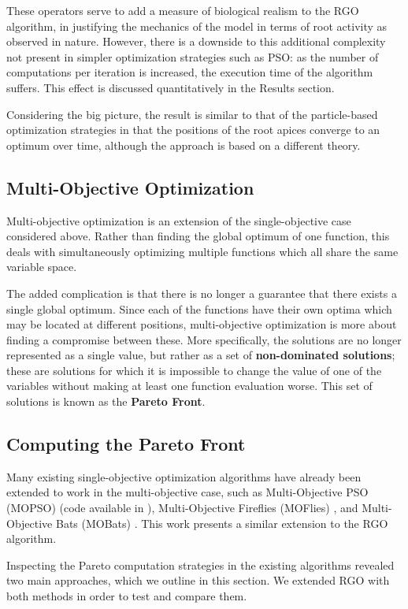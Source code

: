 \documentclass[letterpaper, 10 pt, conference]{ieeeconf}  %
\begin{document}
These operators serve to add a measure of biological realism to the RGO algorithm, in justifying the mechanics of the model in terms of root activity as observed in nature.  However, there is a downside to this additional complexity not present in simpler optimization strategies such as PSO: as the number of computations per iteration is increased, the execution time of the algorithm suffers.  This effect is discussed quantitatively in the Results section.

Considering the big picture, the result is similar to that of the particle-based optimization strategies in that the positions of the root apices converge to an optimum over time, although the approach is based on a different theory.

\subsection{Multi-Objective Optimization}
Multi-objective optimization is an extension of the single-objective case considered above.  Rather than finding the global optimum of one function, this deals with simultaneously optimizing multiple functions which all share the same variable space.  

The added complication is that there is no longer a guarantee that there exists a single global optimum.  Since each of the functions have their own optima which may be located at different positions, multi-objective optimization is more about finding a compromise between these.  More specifically, the solutions are no longer represented as a single value, but rather as a set of \textbf{non-dominated solutions}; these are solutions for which it is impossible to change the value of one of the variables without making at least one function evaluation worse. This set of solutions is known as the \textbf{Pareto Front}.   

\subsection{Computing the Pareto Front}
Many existing single-objective optimization algorithms have already been extended to work in the multi-objective case, such as Multi-Objective PSO (MOPSO) \cite{MOPSOPaper} (code available in \cite{MOPSOCode}), Multi-Objective Fireflies (MOFlies) \cite{MOFliesPaper}, and Multi-Objective Bats (MOBats) \cite{MOBatsPaper}. This work presents a similar extension to the RGO algorithm.

Inspecting the Pareto computation strategies in the existing algorithms revealed two main approaches, which we outline in this section. We extended RGO with both methods in order to test and compare them.
\end{document}
